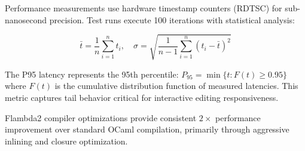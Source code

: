 \documentclass[11pt]{article}
\begin{document}
Performance measurements use hardware timestamp counters (RDTSC) for sub-nanosecond precision. Test runs execute 100 iterations with statistical analysis:

\begin{equation}
\bar{t} = \frac{1}{n} \sum_{i=1}^{n} t_i, \quad \sigma = \sqrt{\frac{1}{n-1} \sum_{i=1}^{n} (t_i - \bar{t})^2}
\end{equation}

The P95 latency represents the 95th percentile: $P_{95} = \min\{t : F(t) \geq 0.95\}$ where $F(t)$ is the cumulative distribution function of measured latencies. This metric captures tail behavior critical for interactive editing responsiveness.

Flambda2 compiler optimizations provide consistent $2\times$ performance improvement over standard OCaml compilation, primarily through aggressive inlining and closure optimization.
\end{document}
